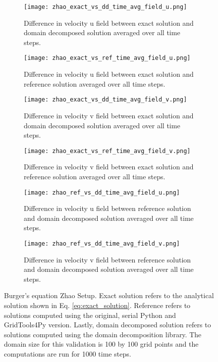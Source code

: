 \begin{figure}[!htbp]
\centering
\begin{subfigure}{0.45\textwidth}
  \centering
  \texttt{[image: zhao\_exact\_vs\_dd\_time\_avg\_field\_u.png]}
  \caption{Difference in velocity u field between exact solution and domain decomposed solution averaged over all time steps.}
  \label{fig:burgers_val1}
\end{subfigure} \hfill
\begin{subfigure}{0.45\textwidth}
  \centering
  \texttt{[image: zhao\_exact\_vs\_ref\_time\_avg\_field\_u.png]}
  \caption{Difference in velocity u field between exact solution and reference solution averaged over all time steps.}
  \label{fig:burgers_val2}
\end{subfigure}

\begin{subfigure}{0.45\textwidth}
  \centering
  \texttt{[image: zhao\_exact\_vs\_dd\_time\_avg\_field\_v.png]}
  \caption{Difference in velocity v field between exact solution and domain decomposed solution averaged over all time steps.}
  \label{fig:burgers_val3}
\end{subfigure} \hfill
\begin{subfigure}{0.45\textwidth}
  \centering
  \texttt{[image: zhao\_exact\_vs\_ref\_time\_avg\_field\_v.png]}
  \caption{Difference in velocity v field between exact solution and reference solution averaged over all time steps.}
  \label{fig:burgers_val4}
\end{subfigure}

\begin{subfigure}{0.45\textwidth}
  \centering
  \texttt{[image: zhao\_ref\_vs\_dd\_time\_avg\_field\_u.png]}
  \caption{Difference in velocity u field between reference solution and domain decomposed solution averaged over all time steps.}
  \label{fig:burgers_val5}
\end{subfigure} \hfill
\begin{subfigure}{0.45\textwidth}
  \centering
  \texttt{[image: zhao\_ref\_vs\_dd\_time\_avg\_field\_v.png]}
  \caption{Difference in velocity v field between reference solution and domain decomposed solution averaged over all time steps.}
  \label{fig:burgers_val6}
\end{subfigure}
\caption{Burger's equation Zhao Setup. 
Exact solution refers to the analytical solution shown in Eq. \ref{eq:exact_solution}.
Reference refers to solutions computed using the original, serial Python and GridTools4Py version.
Lastly, domain decomposed solution refers to solutions computed using the domain decomposition library.
The domain size for this validation is 100 by 100 grid points and the computations are run for 1000 time steps.
}
\label{fig:burgers_validation}
\end{figure}


